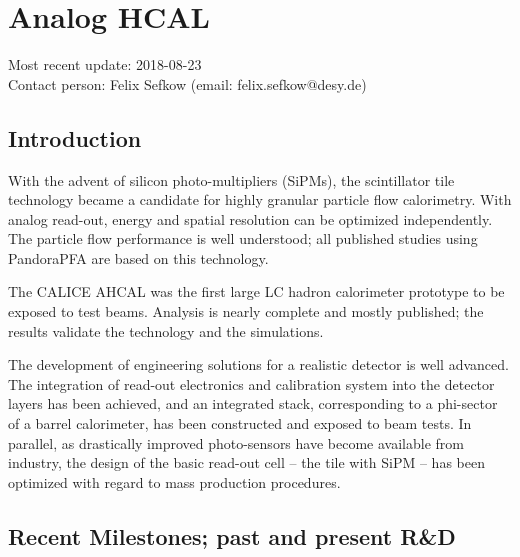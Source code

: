 \section{Analog HCAL}
Most recent update: 2018-08-23\\
Contact person: Felix Sefkow (email: felix.sefkow@desy.de)
\subsection{Introduction}
With the advent of silicon photo-multipliers (SiPMs), the scintillator tile technology became a candidate for highly granular particle flow calorimetry. With analog read-out, energy and spatial resolution can be optimized independently. The particle flow performance is well understood; all published studies using PandoraPFA are based on this technology.

The CALICE AHCAL was the first large LC hadron calorimeter prototype to be exposed to test beams. Analysis is nearly complete and mostly published; the results validate the technology and the simulations.

The development of engineering solutions for a realistic detector is well advanced. The integration of read-out electronics and calibration system into the detector layers has been achieved, and an integrated stack, corresponding to a phi-sector of a barrel calorimeter, has been constructed and exposed to beam tests. In parallel, as drastically improved photo-sensors have become available from industry, the design of the basic read-out cell -- the tile with SiPM -- has been optimized with regard to mass production procedures.

\subsection{Recent Milestones; past and present R\&D}
